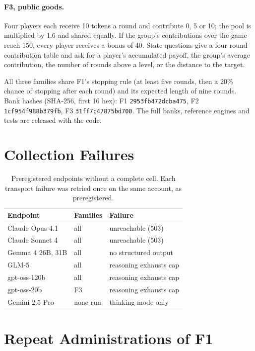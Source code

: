 \documentclass[11pt]{article}
\begin{document}
\paragraph{F3, public goods.} Four players each receive 10 tokens a round and
contribute 0, 5 or 10; the pool is multiplied by 1.6 and shared equally. If the
group's contributions over the game reach 150, every player receives a bonus of
40. State questions give a four-round contribution table and ask for a
player's accumulated payoff, the group's average contribution, the number of
rounds above a level, or the distance to the target.

All three families share F1's stopping rule (at least five rounds, then a
20\% chance of stopping after each round) and its expected length of nine
rounds. Bank hashes (SHA-256, first 16 hex): F1 \texttt{2953fb472dcba475},
F2 \texttt{1cf954f988b379fb}, F3 \texttt{31ff7c47875bd700}. The full banks,
reference engines and tests are released with the code.

\section{Collection Failures}
\label{sec:app-failures}

\begin{table}[h]
  \centering
  \small
  \setlength{\tabcolsep}{3pt}
  \begin{tabular}{@{}lll@{}}
    \toprule
    Endpoint & Families & Failure \\
    \midrule
    Claude Opus 4.1 & all & unreachable (503) \\
    Claude Sonnet 4 & all & unreachable (503) \\
    Gemma 4 26B, 31B & all & no structured output \\
    GLM-5 & all & reasoning exhausts cap \\
    gpt-oss-120b & all & reasoning exhausts cap \\
    gpt-oss-20b & F3 & reasoning exhausts cap \\
    Gemini 2.5 Pro & none run & thinking mode only \\
    \bottomrule
  \end{tabular}
  \caption{Preregistered endpoints without a complete cell. Each transport
  failure was retried once on the same account, as preregistered.}
\end{table}

\section{Repeat Administrations of F1}
\label{sec:app-retest}
\end{document}
